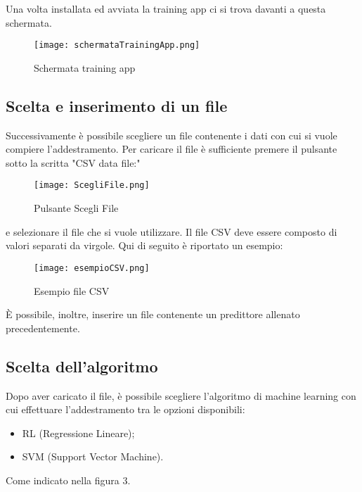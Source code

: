 \documentclass[../manuale-utente.tex]{subfiles}
\begin{document}
Una volta installata ed avviata la training app ci si trova davanti a questa schermata.

\begin{figure}[h!]
  \begin{center}
    \texttt{[image: schermataTrainingApp.png]}\\
    \caption{Schermata training app}%
    \label{fig:trainingApp}
  \end{center}
  \end{figure}

\subsection{Scelta e inserimento di un file}
\label{subs:scelta-e-inserimento}
Successivamente è possibile scegliere un file contenente i dati con cui si vuole compiere l'addestramento. Per caricare il file è sufficiente premere il pulsante sotto la scritta "CSV data file:"

\begin{figure}[h!]
  \begin{center}
    \texttt{[image: ScegliFile.png]}\\
    \caption{Pulsante Scegli File}%
    \label{fig:scegli-file}
  \end{center}
\end{figure}
e selezionare il file che si vuole utilizzare. Il file CSV deve essere composto di valori separati da virgole. Qui di seguito è riportato un esempio:

\begin{figure}[h!]
  \begin{center}
    \texttt{[image: esempioCSV.png]}\\
    \caption{Esempio file CSV}%
    \label{fig:esempioCSV}
  \end{center}
  \end{figure}

  È possibile, inoltre, inserire un file contenente un predittore allenato precedentemente.

\subsection{Scelta dell'algoritmo}
\label{subs:scelta-algoritmo}
Dopo aver caricato il file, è possibile scegliere l'algoritmo di machine learning con cui effettuare l'addestramento tra le opzioni disponibili:
\begin{itemize}
  \item RL (Regressione Lineare);
  \item SVM (Support Vector Machine).
\end{itemize}
Come indicato nella figura 3.
\end{document}
